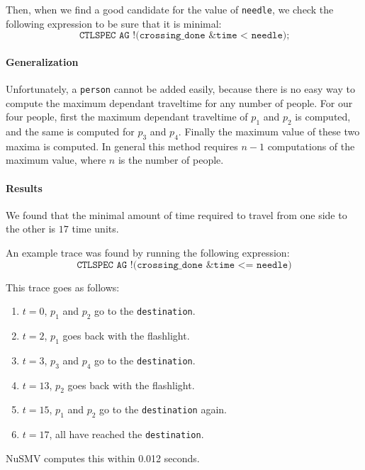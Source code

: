 \documentclass[12pt]{article}
\begin{document}
Then, when we find a good candidate for the value of \texttt{needle}, we check the following expression to be sure that it is minimal:
\[ \texttt{CTLSPEC AG !(crossing\_done \& time < needle);} \]

\paragraph{Generalization}
Unfortunately, a \texttt{person} cannot be added easily, because there is no easy way to compute the maximum dependant traveltime for any number of people.
For our four people, first the maximum dependant traveltime of $p_1$ and $p_2$ is computed, and the same is computed for $p_3$ and $p_4$.
Finally the maximum value of these two maxima is computed.
In general this method requires $n-1$ computations of the maximum value, where $n$ is the number of people.

\paragraph{Results}
We found that the minimal amount of time required to travel from one side to the other is $17$ time units.

An example trace was found by running the following expression:
\[ \texttt{CTLSPEC AG !(crossing\_done \& time <= needle)} \]

This trace goes as follows:
\begin{enumerate}
\item $t = 0$, $p_1$ and $p_2$ go to the \texttt{destination}.
\item $t = 2$, $p_1$ goes back with the flashlight.
\item $t = 3$, $p_3$ and $p_4$ go to the \texttt{destination}.
\item $t = 13$, $p_2$ goes back with the flashlight.
\item $t = 15$, $p_1$ and $p_2$ go to the \texttt{destination} again.
\item $t = 17$, all have reached the \texttt{destination}.
\end{enumerate}

NuSMV computes this within 0.012 seconds.

{}

\end{document}
